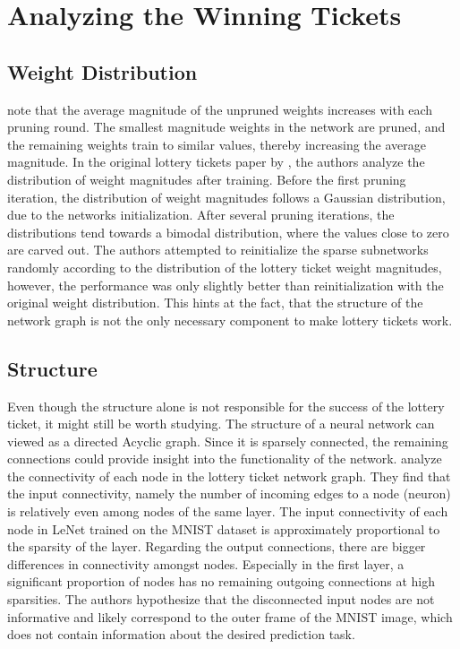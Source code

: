 \section{Analyzing the Winning Tickets}
\subsection{Weight Distribution}
\textcite{maene_towards_2021} note that the average magnitude of the unpruned weights increases with each pruning round.
The smallest magnitude weights in the network are pruned, and the remaining weights train to similar values, thereby increasing the average magnitude.
In the original lottery tickets paper by \textcite{LTH}, the authors analyze the distribution of weight magnitudes after training.
Before the first pruning iteration, the distribution of weight magnitudes follows a Gaussian distribution, due to the networks initialization.
After several pruning iterations, the distributions tend towards a bimodal distribution, where the values close to zero are carved out.
The authors attempted to reinitialize the sparse subnetworks randomly according to the distribution of the lottery ticket weight magnitudes, however, the performance was only slightly better than reinitialization with the original weight distribution.
This hints at the fact, that the structure of the network graph is not the only necessary component to make lottery tickets work.

\subsection{Structure}
Even though the structure alone is not responsible for the success of the lottery ticket, it might still be worth studying.
The structure of a neural network can viewed as a directed Acyclic graph.
Since it is sparsely connected, the remaining connections could provide insight into the functionality of the network.
\textcite{LTH} analyze the connectivity of each node in the lottery ticket network graph.
They find that the input connectivity, namely the number of incoming edges to a node (neuron) is relatively even among nodes of the same layer.
The input connectivity of each node in LeNet trained on the MNIST dataset is approximately proportional to the sparsity of the layer.
Regarding the output connections, there are bigger differences in connectivity amongst nodes.
Especially in the first layer, a significant proportion of nodes has no remaining outgoing connections at high sparsities.
The authors hypothesize that the disconnected input nodes are not informative and likely correspond to the outer frame of the MNIST image, which does not contain information about the desired prediction task.

